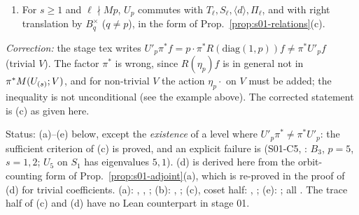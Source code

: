 \begin{lemma}[properties of $N_{U_p}$]
\begin{enumerate}[label=(\alph*)]
  $d\equiv1\bmod p^s$ (the diamond at the primes dividing $M$); so under $\nu$ the homological $U_p$ on $\Zp[S_s]$ becomes
  $\langle p\rangle_MU'_p$ on $\Zp^{S_s}$: $\nu\circ U_p=\langle p\rangle_MU'_p\circ\nu$ (consistent with (b), (c) and
  Prop.~\ref{prop:s01-adjoint}(c)).
\item For $s\ge1$ and $\ell\nmid Mp$, $U_p$ commutes with $T_\ell,S_\ell,\langle d\rangle,\Pi_\ell$, and with right translation by
  $B_q^\times$ ($q\ne p$), in the form of Prop.~\ref{prop:s01-relations}(c).
\end{enumerate}
\emph{Correction:} the stage tex writes $U'_p\pi^*f=p\cdot\pi^*R(\mathrm{diag}(1,p))f\ne\pi^*U'_pf$ (trivial $V$). The factor
$\pi^*$ is wrong, since $R(\eta_p)f$ is in general not in $\pi^*M(U_{(s)};V)$, and for non-trivial $V$ the action $\eta_p\cdot$ on $V$ must be added;
the inequality is not unconditional (see the example above). The corrected statement is (c) as given here.

Status: (a)--(e) \stproved{} below, except the \emph{existence} of a level where $U'_p\pi^*\ne\pi^*U'_p$: the sufficient
criterion of (c) is proved, and an explicit failure is \stcomp{} (S01-C5, : $B_3$, $p=5$, $s=1,2$; $U_5$ on $S_1$ has eigenvalues $5,1$). (d) is derived here from the orbit-counting form of Prop.~\ref{prop:s01-adjoint}(a), which
is re-proved in the proof of (d) for trivial coefficients.
(a): , ,
; (b): , ;
(c), coset half: , ; (e):
; all \stformal{}. The trace half of (c) and (d) have no Lean counterpart in stage 01.
\end{lemma}
